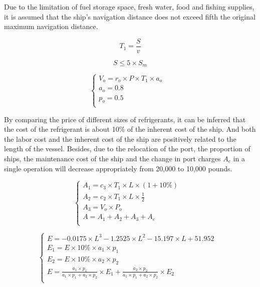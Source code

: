 \documentclass{mcmthesis}
\begin{document}
Due to the limitation of fuel storage space, fresh water, food and fishing supplies, it is assumed that the ship's navigation distance does not exceed fifth the original maximum navigation distance.

\begin{equation}\label{4}
T_1=\frac{S}{v}
\end{equation}

\begin{equation}\label{4}
S \leq 5\times S_m
\end{equation}

\begin{equation}
\left\{
\begin{array}{lr}
V_o=r_o \times P \times T_1 \times a_o &\\
a_o=0.8  & \\    p_o=0.5 \\
\end{array}
\right.
\end{equation}

By comparing the price of different sizes of refrigerants, it can be inferred that the cost of the refrigerant is about 10\% of the inherent cost of the ship. And both the labor cost and the inherent cost of the ship are positively related to the length of the vessel. Besides, due to the relocation of the port, the proportion of ships, the maintenance cost of the ship and the change in port charges $A_e$ in a single operation will decrease appropriately from 20,000 to 10,000 pounds. 

			\begin{equation}
			\left\{
			\begin{array}{lr}

A_1=c_3 \times T_1\times L \times (1+10\%) &\\
A_2=c_2  \times T_1 \times L \times  \frac{1}{2} &\\
A_3=V_o  \times P_o &\\
A=A_1+A_2+A_3+A_e \\		
			\end{array}
			\right.
			\end{equation}



\begin{equation}
\left\{
\begin{array}{lr}
E= -0.0175\times L^3 -1.2525\times L^2 - 15.197 \times L+ 51.952&\\
E_1=E \times 10\% \times a_1 \times p_1 &\\
E_2=E\times 10\% \times a_2 \times p_2 &\\
E= \frac{a_1 \times p_1}{a_1 \times p_1+ a_2 \times p_2} \times E_1 + \frac{a_2 \times p_2}{a_1 \times p_1+ a_2 \times p_2} \times E_2\\

\end{array}
\right.
\end{equation}
\end{document}
